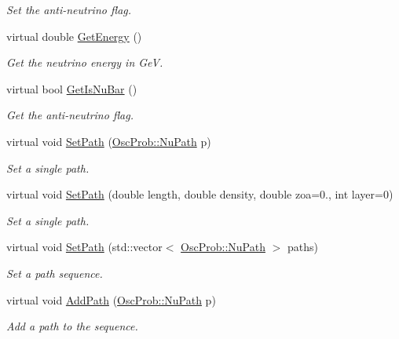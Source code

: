 \begin{DoxyCompactItemize}
\begin{DoxyCompactList}\small\item\em Set the anti-\/neutrino flag. \end{DoxyCompactList}\item 
virtual double \hyperlink{classOscProb_1_1PMNS__Base_acc0d46cc4b8f911b40b807225003bbed}{Get\+Energy} ()
\begin{DoxyCompactList}\small\item\em Get the neutrino energy in GeV. \end{DoxyCompactList}\item 
virtual bool \hyperlink{classOscProb_1_1PMNS__Base_a2f7f2a028dfe7a90fff6b4f757972c2c}{Get\+Is\+Nu\+Bar} ()
\begin{DoxyCompactList}\small\item\em Get the anti-\/neutrino flag. \end{DoxyCompactList}\item 
virtual void \hyperlink{classOscProb_1_1PMNS__Base_ac3b644fd0a56347d304ceca4ae9d8875}{Set\+Path} (\hyperlink{structOscProb_1_1NuPath}{Osc\+Prob\+::\+Nu\+Path} p)
\begin{DoxyCompactList}\small\item\em Set a single path. \end{DoxyCompactList}\item 
virtual void \hyperlink{classOscProb_1_1PMNS__Base_a35b983270613072a3df58b574d80dbfd}{Set\+Path} (double length, double density, double zoa=0., int layer=0)
\begin{DoxyCompactList}\small\item\em Set a single path. \end{DoxyCompactList}\item 
virtual void \hyperlink{classOscProb_1_1PMNS__Base_a637d19dd850b4246507796526622643c}{Set\+Path} (std\+::vector$<$ \hyperlink{structOscProb_1_1NuPath}{Osc\+Prob\+::\+Nu\+Path} $>$ paths)
\begin{DoxyCompactList}\small\item\em Set a path sequence. \end{DoxyCompactList}\item 
virtual void \hyperlink{classOscProb_1_1PMNS__Base_a887dc9d4dc569ec0cdef3933b4c60efc}{Add\+Path} (\hyperlink{structOscProb_1_1NuPath}{Osc\+Prob\+::\+Nu\+Path} p)
\begin{DoxyCompactList}\small\item\em Add a path to the sequence. \end{DoxyCompactList}\item 

\end{DoxyCompactItemize}
